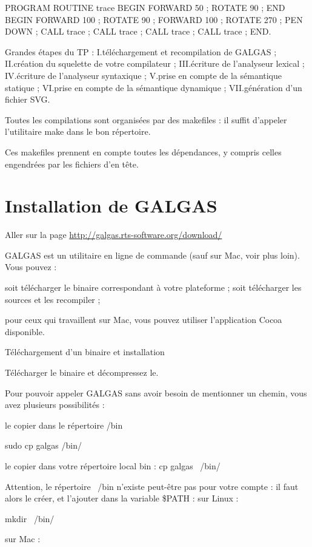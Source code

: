 PROGRAM
  ROUTINE trace
  BEGIN
  FORWARD 50 ;
  ROTATE 90 ;
  END
BEGIN
  FORWARD 100 ;
  ROTATE 90 ;
  FORWARD 100 ;
  ROTATE 270 ;
  PEN DOWN ;
  CALL trace ;
  CALL trace ;
  CALL trace ;
  CALL trace ;
END.

Grandes étapes du TP :
I.téléchargement et recompilation de GALGAS ;
II.création du squelette de votre compilateur ;
III.écriture de l'analyseur lexical ;
IV.écriture de l'analyseur syntaxique ;
V.prise en compte de la sémantique statique ;
VI.prise en compte de la sémantique dynamique ;
VII.génération d'un fichier SVG.

Toutes les compilations sont organisées par des makefiles : il suffit d'appeler l’utilitaire make dans le bon répertoire.

Ces makefiles prennent en compte toutes les dépendances, y compris celles engendrées par les fichiers d'en tête.

\section{Installation de GALGAS}

Aller sur la page \url{http://galgas.rts-software.org/download/}

GALGAS est un utilitaire en ligne de commande (sauf sur Mac, voir plus loin). Vous pouvez :

soit télécharger le binaire correspondant à votre plateforme ;
soit télécharger les sources et les recompiler ;

pour ceux qui travaillent sur Mac, vous pouvez utiliser l’application Cocoa disponible.

Téléchargement d’un binaire et installation

Télécharger le binaire et décompressez le.

Pour pouvoir appeler GALGAS sans avoir besoin de mentionner un chemin, vous avez plusieurs possibilités :

le copier dans le répertoire /bin

sudo cp galgas /bin/

le copier dans votre répertoire local bin :
cp galgas ~/bin/

Attention, le répertoire ~/bin n'existe peut-être pas pour votre compte : il faut alors le créer, et l'ajouter dans la variable \$PATH :
sur Linux :

mkdir ~/bin/

sur Mac :

